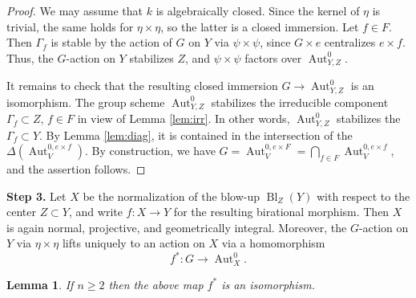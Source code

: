 \documentclass[oneside, 12pt]{amsart}
\newtheorem{lemma}[theorem]{Lemma}
\theoremstyle{definition}
\theoremstyle{remark}
\newcommand{\Aut}{\operatorname{Aut}}
\newcommand{\Bl}{\operatorname{Bl}}
\newcommand{\ra}{\rightarrow}
\begin{document}
\begin{proof}
We may assume that $k$ is algebraically closed.  
Since the kernel of $\eta$ is trivial,
the same holds for  $\eta \times \eta$, so the latter is a closed immersion.
Let $f \in F$. Then $\Gamma_f$ is stable
by the action of $G$ on $Y$ via $\psi\times\psi$,
since $G \times e$ centralizes $e \times f$. 
Thus, the $G$-action on $Y$  stabilizes $Z$, and $\psi\times\psi$ factors over 
$\Aut_{Y,Z}^0$.

It remains to check that the resulting closed immersion 
$G\ra\Aut_{Y,Z}^0$ is an isomorphism.
The  group scheme $ \Aut_{Y,Z}^0$ stabilizes the 
irreducible component $\Gamma_f\subset Z$, $f\in F$ in view of 
Lemma \ref{lem:irr}. In other words, $\Aut_{Y,Z}^0$ stabilizes 
the $\Gamma_f\subset Y$.
By Lemma \ref{lem:diag}, it is contained in the intersection of the 
$\Delta(\Aut_V^{0,e\times f})$. By construction, we have 
$G=\Aut_V^{0,e \times F}=\bigcap_{f\in F} \Aut_V^{0,e\times f}$, 
and the assertion follows. 
\end{proof}


\noindent
{\bf Step 3.}
Let $X$ be the normalization of the blow-up $\Bl_Z(Y)$  
with respect to the center $Z\subset Y$, and write
$f:X\ra Y$ for the resulting  birational morphism.
Then $X$ is again normal, projective,
and geometrically integral. Moreover,
the $G$-action on $Y$ via $\eta \times \eta$
lifts uniquely to an action on $X$ via
a homomorphism
\[ f^* : G \longrightarrow \Aut^0_X. \]


\begin{lemma}\label{lem:f}
If $n \geq 2$ then the above map
$f^*$ is an isomorphism.
\end{lemma}
\end{document}
